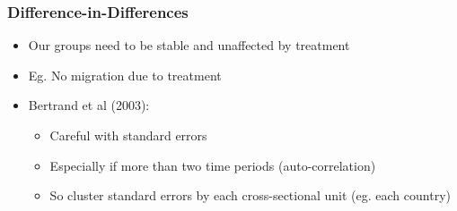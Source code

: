 \documentclass[xcolor=x11names,compress]{beamer}\usepackage[]{graphicx}\usepackage[]{color}
\renewcommand{\(}{\begin{columns}}
\renewcommand{\)}{\end{columns}}
\newcommand{\<}[1]{\begin{column}{#1}}
\renewcommand{\>}{\end{column}}
\begin{document}
\begin{frame}
\frametitle{Difference-in-Differences}
\begin{itemize}
\item Our groups need to be stable and unaffected by treatment
\item Eg. No migration due to treatment
\pause
\item Bertrand et al (2003):
\begin{itemize}
\item Careful with standard errors
\item Especially if more than two time periods (auto-correlation)
\item So cluster standard errors by each cross-sectional unit (eg. each country)
\end{itemize}
\end{itemize}
\end{frame}
\end{document}
